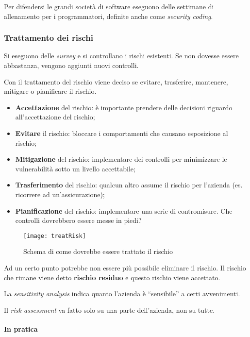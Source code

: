 Per difendersi le grandi società di software eseguono delle settimane di
allenamento per i programmatori, definite anche come \textit{security coding}.



\subsubsection{Trattamento dei rischi}

Si eseguono delle \textit{survey} e si controllano i rischi esistenti. Se non
dovesse essere abbastanza, vengono aggiunti nuovi controlli.

Con il trattamento del rischio viene deciso se evitare, trasferire, mantenere,
mitigare o pianificare il rischio.

\begin{itemize}
\item \textbf{Accettazione} del rischio: è importante prendere delle decisioni
riguardo all'accettazione del rischio;
\item \textbf{Evitare} il rischio: bloccare i comportamenti che causano
esposizione al rischio;
\item \textbf{Mitigazione} del rischio: implementare dei controlli per
minimizzare le vulnerabilità sotto un livello accettabile;
\item \textbf{Trasferimento} del rischio: qualcun altro assume il rischio per
l'azienda (es. ricorrere ad un'assicurazione);
\item \textbf{Pianificazione} del rischio: implementare una serie di
contromisure. Che controlli dovrebbero essere messe in piedi?
\end{itemize}

\begin{figure}[H]
 \centering
 \texttt{[image: treatRisk]}
 \caption{Schema di come dovrebbe essere trattato il rischio}
\end{figure}



Ad un certo punto potrebbe non essere più possibile eliminare il rischio. Il
rischio che rimane viene detto \textbf{rischio residuo} e questo rischio viene
accettato.

La \textit{sensitivity analysis} indica quanto l'azienda è ``sensibile'' a
certi avvenimenti.

Il \textit{risk assessment} va fatto solo su una parte dell'azienda, non su
tutte.

\paragraph*{In pratica}

